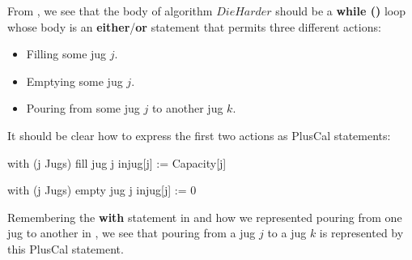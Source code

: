 \documentclass[fleqn,leqno]{article}
\begin{document}
From , we see that 
the body of algorithm $DieHarder$ should be a 
  \textbf{while (}\TRUE\textbf{)}
loop whose body is an \textbf{either}/\textbf{or} statement that
permits three different actions:
\begin{itemize}
\item Filling some jug $j$.

\item Emptying some jug $j$.

\item Pouring from some jug $j$ to another jug $k$.
\end{itemize}
It should be clear how to express the first two actions as PlusCal
statements:
\vspace{-.5em}
\begin{twocols}
\begin{nopcal}
with (j \in Jugs) \* fill jug j
  { injug[j] := Capacity[j] }
\end{nopcal}
\begin{tlatex}
%
%
\@xx{}%
%
\end{tlatex}
\midcol
\begin{nopcal}
with (j \in Jugs) \* empty jug j
  { injug[j] := 0 }
\end{nopcal}
\begin{tlatex}
%
%
\@xx{}%
%
\end{tlatex}
\end{twocols}
\vspace{.5em}
Remembering the \textbf{with} statement in 
  and
how we represented pouring from one jug to another in
, we see that pouring from a jug
$j$ to a jug $k$ is represented by this PlusCal statement.%
\end{document}
